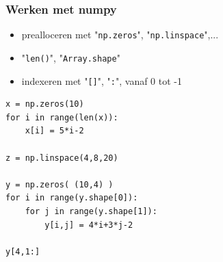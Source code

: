 \documentclass[t]{beamer}
\begin{document}
\begin{frame}[fragile]
	\frametitle{Werken met numpy}
	
	\begin{itemize}
		\item prealloceren met "\lstinline{np.zeros}", "\lstinline{np.linspace}",...
		\item "\lstinline{len()}", "\lstinline{Array.shape}"
		\item indexeren met "\lstinline{[]}", "\lstinline{:}", vanaf 0 tot -1
	\end{itemize}
	
	\begin{lstlisting}
x = np.zeros(10)
for i in range(len(x)):
    x[i] = 5*i-2

z = np.linspace(4,8,20)

y = np.zeros( (10,4) )
for i in range(y.shape[0]):
	for j in range(y.shape[1]):
    	y[i,j] = 4*i+3*j-2

y[4,1:]
	\end{lstlisting}
	
\end{frame}
\end{document}
